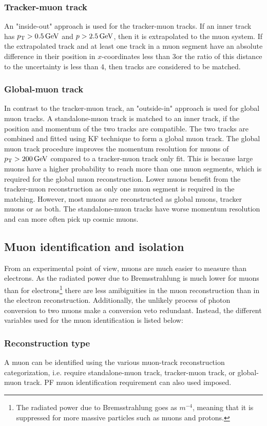 \subsubsection*{Tracker-muon track}
\noindent\justify
An "inside-out" approach is used for the tracker-muon tracks. 
If an inner track has $p_{\mathrm{T}} > 0.5\,\text{Ge\hspace{-.08em}V}$ and $p > 2.5\,\text{Ge\hspace{-.08em}V}$, then it is extrapolated to the muon system. 
If the extrapolated track and at least one track in a muon segment have an absolute difference in their position in $x$-coordinates less than 3\cm or the ratio of this distance to the uncertainty is less than 4, then tracks are considered to be matched.  
\subsubsection*{Global-muon track}
\noindent\justify
In contrast to the tracker-muon track, an "outside-in" approach is used for global muon tracks. 
A standalone-muon track is matched to an inner track, if the position and momentum of the two tracks are compatible. 
The two tracks are combined and fitted using KF technique to form a global muon track. 
The global muon track procedure improves the momentum resolution for muons of $p_{\mathrm{T}} > 200\,\text{Ge\hspace{-.08em}V}$ compared to a tracker-muon track only fit. 
This is because large \pt muons have a higher probability to reach more than one muon segments, which is required for the global muon reconstruction. 
Lower \pt muons benefit from the tracker-muon reconstruction as only one muon segment is required in the matching. 
However, most muons are reconstructed as global muons, tracker muons or as both. The standalone-muon tracks have worse momentum resolution and can more often pick up cosmic muons. 
\subsection*{Muon identification and isolation}
\noindent\justify
From an experimental point of view, muons are much easier to measure than electrons. 
As the radiated power due to Bremsstrahlung is much lower for muons than for electrons\footnote{The radiated power due to Bremsstrahlung goes as $m^{-4}$, meaning that it is suppressed for more massive particles such as muons and protons.} there are less amibiguities in the muon reconstruction than in the electron reconstruction. 
Additionally, the unlikely process of photon conversion to two muons make a conversion veto redundant.   
Instead, the different variables used for the muon identification is listed below:
\subsubsection*{Reconstruction type}
\noindent\justify
 A muon can be identified using the various muon-track reconstruction categorization, i.e. require standalone-muon track, tracker-muon track, or global-muon track. 
PF muon identification requirement can also used imposed.
